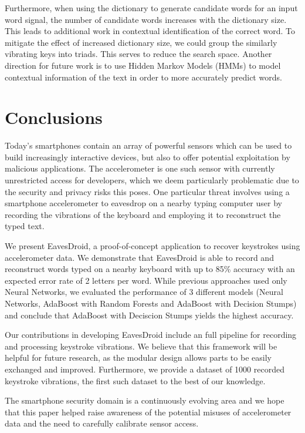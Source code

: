 \documentclass[11pt,conference]{IEEEtran}
\begin{document}
Furthermore, when using the dictionary to generate
candidate words for an input word signal, the number of candidate words increases with the dictionary
size. This leads to additional work in contextual identification of the correct word. To mitigate the
effect of increased dictionary size, we could group the similarly vibrating keys into triads. This serves
to reduce the search space. 
Another direction for future work is to use Hidden Markov Models (HMMs) to model contextual information of the text in order to more accurately predict words.


\section{Conclusions}
\label{sec:conclusion}

Today's smartphones contain an array of powerful sensors which can be used to build increasingly interactive devices, but also to offer potential exploitation by malicious applications. The accelerometer is one such sensor with currently unrestricted access for developers, which we deem particularly problematic due to the security and privacy risks this poses. One particular threat involves using a smartphone accelerometer to eavesdrop on a nearby typing computer user by recording the vibrations of the keyboard and employing it to reconstruct the typed text.

We present EavesDroid, a proof-of-concept application to recover keystrokes using accelerometer data. We demonstrate that EavesDroid is able to record and reconstruct words typed on a nearby keyboard with up to 85\% accuracy with an expected error rate of 2 letters per word. While previous approaches used only Neural Networks, we evaluated the performance of 3 different models (Neural Networks, AdaBoost with Random Forests and AdaBoost with Decision Stumps) and conclude that AdaBoost with Deciscion Stumps yields the highest accuracy.

Our contributions in developing EavesDroid include an full pipeline for recording and processing keystroke vibrations. We believe that this framework will be helpful for future research, as the modular design allows parts to be easily exchanged and improved.
Furthermore, we provide a dataset of 1000 recorded keystroke vibrations, the first such dataset to the best of our knowledge.

The smartphone security domain is a continuously evolving area and we hope that this paper helped raise awareness of the potential misuses of accelerometer data and the need to carefully calibrate sensor access.
\end{document}
